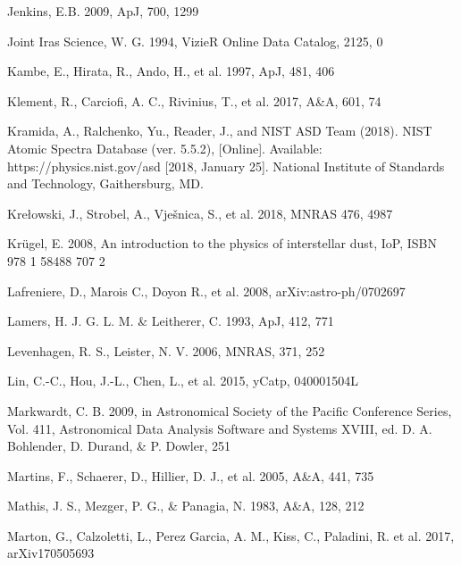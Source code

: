 \documentclass[tradiabstract]{aa} %
\begin{document}
\begin{thebibliography}{}
\item[] Jenkins, E.B. 2009, ApJ, 700, 1299

\item[] Joint Iras Science, W. G. 1994, VizieR Online Data Catalog, 2125, 0

\item[] Kambe, E., Hirata, R., Ando, H., et al. 1997, ApJ, 481, 406

\item[] Klement, R., Carciofi, A. C., Rivinius, T., et al. 2017, A\&A, 601, 74

\item[] Kramida, A., Ralchenko, Yu., Reader, J., and NIST ASD Team
  (2018). NIST Atomic Spectra Database (ver. 5.5.2),
  [Online]. Available: https://physics.nist.gov/asd [2018, January
    25]. National Institute of Standards and Technology, Gaithersburg, MD.

\item[] Kre{\l}owski, J., Strobel, A., Vje\v{s}nica, S., et al. 2018,
  MNRAS 476, 4987
  
  
\item[] Kr\"ugel, E. 2008, An introduction to the physics of
  interstellar dust, IoP, ISBN 978 1 58488 707 2

\item[] Lafreniere, D., Marois C., Doyon R., et al. 2008, arXiv:astro-ph/0702697

\item[] Lamers, H. J. G. L. M. \& Leitherer, C. 1993, ApJ, 412, 771


\item[] Levenhagen, R. S., Leister, N. V. 2006, MNRAS, 371, 252
  
\item[] Lin, C.-C., Hou, J.-L., Chen, L., et al.   2015, yCatp, 040001504L

\item[] Markwardt, C. B. 2009, in Astronomical Society of the Pacific
Conference Series, Vol. 411, Astronomical Data Analysis Software
and Systems XVIII, ed. D. A. Bohlender, D. Durand, \& P. Dowler,
251

\item[] Martins, F., Schaerer, D., Hillier, D. J., et al. 2005, A\&A, 441, 735

\item[] Mathis, J. S., Mezger, P. G., \& Panagia, N. 1983, A\&A, 128, 212


\item[] Marton, G., Calzoletti, L., Perez Garcia, A. M., Kiss, C.,
  Paladini, R.  et al. 2017, arXiv170505693



\end{thebibliography}
\end{document}
